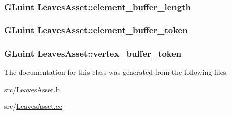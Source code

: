 \subsubsection[{element\+\_\+buffer\+\_\+length}]{\setlength{\rightskip}{0pt plus 5cm}G\+Luint Leaves\+Asset\+::element\+\_\+buffer\+\_\+length\hspace{0.3cm}{\ttfamily [private]}}\label{classLeavesAsset_a6a09aacce21f8ce5a6b80da9f40bc9d5}
\hypertarget{classLeavesAsset_a2a47b7b2ad8a35f4499a12db80073efb}{}
\subsubsection[{element\+\_\+buffer\+\_\+token}]{\setlength{\rightskip}{0pt plus 5cm}G\+Luint Leaves\+Asset\+::element\+\_\+buffer\+\_\+token\hspace{0.3cm}{\ttfamily [private]}}\label{classLeavesAsset_a2a47b7b2ad8a35f4499a12db80073efb}
\hypertarget{classLeavesAsset_a360df8eb2239e2f4ed069522d0de7629}{}
\subsubsection[{vertex\+\_\+buffer\+\_\+token}]{\setlength{\rightskip}{0pt plus 5cm}G\+Luint Leaves\+Asset\+::vertex\+\_\+buffer\+\_\+token\hspace{0.3cm}{\ttfamily [private]}}\label{classLeavesAsset_a360df8eb2239e2f4ed069522d0de7629}


The documentation for this class was generated from the following files\+:\begin{DoxyCompactItemize}
\item 
src/\hyperlink{LeavesAsset_8h}{Leaves\+Asset.\+h}\item 
src/\hyperlink{LeavesAsset_8cc}{Leaves\+Asset.\+cc}\end{DoxyCompactItemize}
